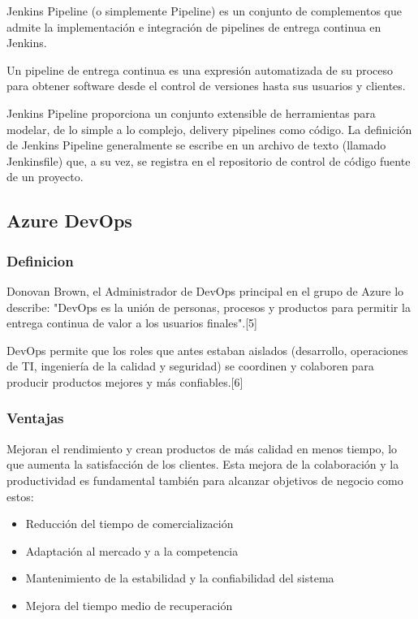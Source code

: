 \documentclass[twoside,twocolumn]{article}
\begin{document}
Jenkins Pipeline (o simplemente Pipeline) es un conjunto de complementos que admite la implementación e integración de pipelines de entrega continua en Jenkins.

Un pipeline de entrega continua es una expresión automatizada de su proceso para obtener software desde el control de versiones hasta sus usuarios y clientes.

Jenkins Pipeline proporciona un conjunto extensible de herramientas para modelar, de lo simple a lo complejo, delivery pipelines como código. La definición de Jenkins Pipeline generalmente se escribe en un archivo de texto (llamado Jenkinsfile) que, a su vez, se registra en el repositorio de control de código fuente de un proyecto.

\subsection{Azure DevOps}

\subsubsection{Definicion}

Donovan Brown, el Administrador de DevOps principal en el grupo de Azure lo describe: "DevOps es la unión de personas, procesos y productos para permitir la entrega continua de valor a los usuarios finales".[5]

DevOps permite que los roles que antes estaban aislados (desarrollo, operaciones de TI, ingeniería de la calidad y seguridad) se coordinen y colaboren para producir productos mejores y más confiables.[6]

\subsubsection{Ventajas}

Mejoran el rendimiento y crean productos de más calidad en menos tiempo, lo que aumenta la satisfacción de los clientes. Esta mejora de la colaboración y la productividad es fundamental también para alcanzar objetivos de negocio como estos:

\begin{itemize}
\item Reducción del tiempo de comercialización
\item Adaptación al mercado y a la competencia
\item Mantenimiento de la estabilidad y la confiabilidad del sistema
\item Mejora del tiempo medio de recuperación
\end{itemize}
\end{document}
